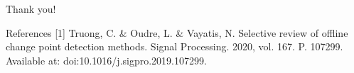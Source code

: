 \documentclass[first=orange,second=blue,logo=blueque]{aaltoslides}
\begin{document}

\begin{frame}{Thank you!}
    \begin{block}{References}
        [1] Truong, C. \& Oudre, L. \& Vayatis, N. Selective review of offline change point detection methods. Signal Processing. 2020, vol. 167. P. 107299. Available at: doi:10.1016/j.sigpro.2019.107299.
    \end{block}
\end{frame}
\end{document}
